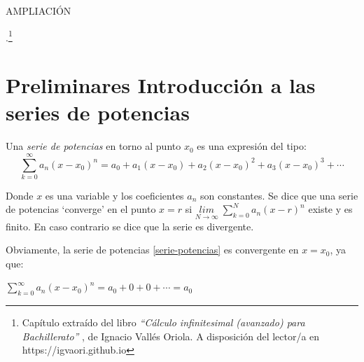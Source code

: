 
\vspace{1cm}

\begin{Huge}
AMPLIACIÓN	
\end{Huge}\normalsize{.}\footnote{Capítulo extraído del libro \emph{``Cálculo infinitesimal (avanzado) para Bachillerato'' }, de 	\textsf{Ignacio Vallés Oriola}. A disposición del lector/a en \textcolor{NavyBlue}{https://igvaori.github.io}}


\vspace{1cm}

\section{Preliminares Introducción a las series de potencias}
\vspace{0.5cm}

Una \emph{serie de potencias} en torno al punto $x_0$ es una expresión del tipo:
\begin{equation*}
	\label{serie-potencias}
	\sum _{ k=0 }^{ \infty }{a_n(x-x_0)^n}=a_0+a_1(x-x_0)+a_2(x-x_0)^2+a_3(x-x_0)^3+\cdots 
\end{equation*}

Donde $x$ es una variable y los coeficientes $a_n$ son constantes. Se dice que una serie de potencias `converge' en el punto $x=r$  si $\underset{N\to \infty}{lim }\;{\sum _{ k=0 }^{ N }{a_n(x-r)^n}}$ existe y es finito. En caso contrario se dice que la serie es divergente.

Obviamente, la serie de potencias \ref{serie-potencias} es convergente en $x=x_0$, ya que: 

$\sum _{ k=0 }^{ \infty }{a_n(x-x_0)^n}=a_0+0+0+\cdots =a_0$

